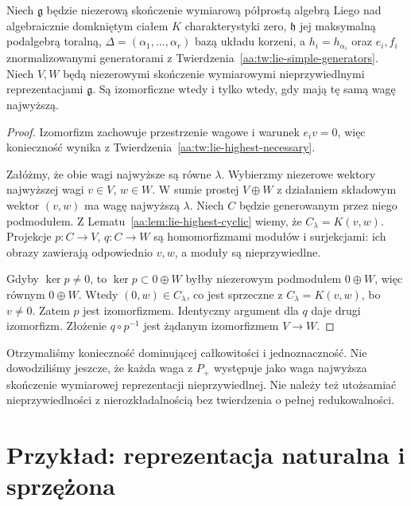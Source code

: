 \begin{twierdzenie}
\label{aa:tw:lie-highest-uniqueness}
Niech $\mathfrak g$ będzie niezerową skończenie wymiarową półprostą algebrą Liego nad algebraicznie domkniętym ciałem $K$ charakterystyki zero, $\mathfrak h$ jej maksymalną podalgebrą toralną, $\Delta=(\alpha_1,\ldots,\alpha_r)$ bazą układu korzeni, a $h_i=h_{\alpha_i}$ oraz $e_i,f_i$ znormalizowanymi generatorami z Twierdzenia~\ref{aa:tw:lie-simple-generators}. Niech $V,W$ będą niezerowymi skończenie wymiarowymi nieprzywiedlnymi reprezentacjami $\mathfrak g$. Są izomorficzne wtedy i tylko wtedy, gdy mają tę samą wagę najwyższą.
\end{twierdzenie}
\begin{proof}
Izomorfizm zachowuje przestrzenie wagowe i warunek $e_iv=0$, więc konieczność wynika z Twierdzenia~\ref{aa:tw:lie-highest-necessary}.

Załóżmy, że obie wagi najwyższe są równe $\lambda$. Wybierzmy niezerowe wektory najwyższej wagi $v\in V$, $w\in W$. W sumie prostej $V\oplus W$ z działaniem składowym wektor $(v,w)$ ma wagę najwyższą $\lambda$. Niech $C$ będzie generowanym przez niego podmodułem. Z Lematu~\ref{aa:lem:lie-highest-cyclic} wiemy, że $C_\lambda=K(v,w)$. Projekcje $p:C\to V$, $q:C\to W$ są homomorfizmami modułów i surjekcjami: ich obrazy zawierają odpowiednio $v,w$, a moduły są nieprzywiedlne.

Gdyby $\ker p\ne0$, to $\ker p\subset 0\oplus W$ byłby niezerowym podmodułem $0\oplus W$, więc równym $0\oplus W$. Wtedy $(0,w)\in C_\lambda$, co jest sprzeczne z $C_\lambda=K(v,w)$, bo $v\ne0$. Zatem $p$ jest izomorfizmem. Identyczny argument dla $q$ daje drugi izomorfizm. Złożenie $q\circ p^{-1}$ jest żądanym izomorfizmem $V\to W$.
\end{proof}

Otrzymaliśmy konieczność dominującej całkowitości i jednoznaczność. Nie dowodziliśmy jeszcze, że każda waga z $P_+$ występuje jako waga najwyższa skończenie wymiarowej reprezentacji nieprzywiedlnej. Nie należy też utożsamiać nieprzywiedlności z nierozkładalnością bez twierdzenia o pełnej redukowalności.

\newpage
\section{Przykład: reprezentacja naturalna i sprzężona}


